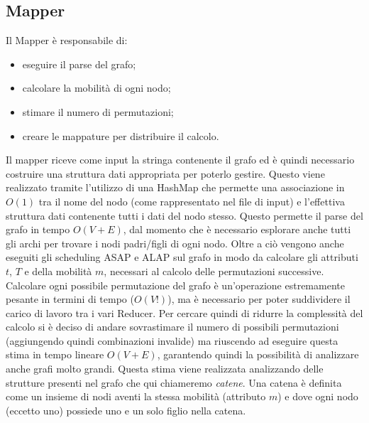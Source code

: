 \documentclass[]{IEEEtran}
\begin{document}
\subsection{Mapper}
Il Mapper è responsabile di:
\begin{itemize}
	\item eseguire il parse del grafo;
	\item calcolare la mobilità di ogni nodo;
	\item stimare il numero di permutazioni;
	\item creare le mappature per distribuire il calcolo.
\end{itemize}
Il mapper riceve come input la stringa contenente il grafo ed è quindi necessario costruire una struttura dati appropriata per poterlo gestire. Questo viene realizzato tramite l'utilizzo di una HashMap che permette una associazione in $O(1)$ tra il nome del nodo (come rappresentato nel file di input) e l'effettiva struttura dati contenente tutti i dati del nodo stesso. Questo permette il parse del grafo in tempo $O(V+E)$, dal momento che è necessario esplorare anche tutti gli archi per trovare i nodi padri/figli di ogni nodo. Oltre a ciò vengono anche eseguiti gli scheduling ASAP e ALAP sul grafo in modo da calcolare gli attributi $t$, $T$ e della mobilità $m$, necessari al calcolo delle permutazioni successive.
Calcolare ogni possibile permutazione del grafo è un'operazione estremamente pesante in termini di tempo ($O(V!)$), ma è necessario per poter suddividere il carico di lavoro tra i vari Reducer. Per cercare quindi di ridurre la complessità del calcolo si è  deciso di andare sovrastimare il numero di possibili permutazioni (aggiungendo quindi combinazioni invalide) ma riuscendo ad eseguire questa stima in tempo lineare $O(V+E)$, garantendo quindi la possibilità di analizzare anche grafi molto grandi. Questa stima viene realizzata analizzando delle strutture presenti nel grafo che qui chiameremo \emph{catene}. Una catena è definita come un insieme di nodi aventi la stessa mobilità (attributo $m$) e dove ogni nodo (eccetto uno) possiede uno e un solo figlio nella catena.
\end{document}
